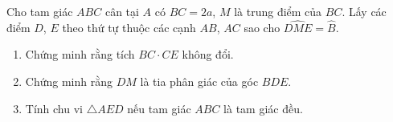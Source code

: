 \begin{bt}%
Cho tam giác $ ABC $ cân tại $ A $ có $ BC=2a $, $ M $ là trung điểm của $ BC $. Lấy các điểm $ D $, $ E $ theo thứ tự thuộc các cạnh $ AB $, $ AC $ sao cho $ \widehat{DME}= \widehat{B}$.
\begin{enumerate}
	\item Chứng minh rằng tích $ BC \cdot CE $ không đổi.
	\item Chứng minh rằng $ DM $ là tia phân giác của góc $ BDE. $
	\item Tính chu vi $ \triangle AED $ nếu tam giác $ ABC $ là tam giác đều.
\end{enumerate}
\end{bt}
